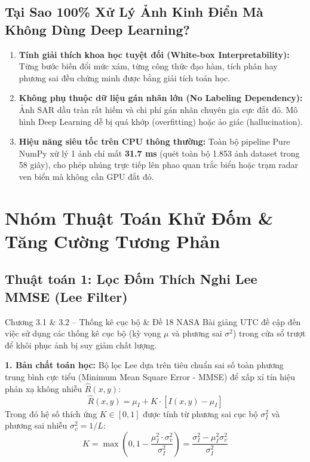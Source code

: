 \documentclass[11pt,a4paper]{article}
\begin{document}
\subsection{Tại Sao 100\% Xử Lý Ảnh Kinh Điển Mà Không Dùng Deep Learning?}
\begin{whyuse}
\begin{enumerate}
    \item \textbf{Tính giải thích khoa học tuyệt đối (White-box Interpretability):} Từng bước biến đổi mức xám, từng công thức đạo hàm, tích phân hay phương sai đều chứng minh được bằng giải tích toán học.
    \item \textbf{Không phụ thuộc dữ liệu gán nhãn lớn (No Labeling Dependency):} Ảnh SAR dầu tràn rất hiếm và chi phí gán nhãn chuyên gia cực đắt đỏ. Mô hình Deep Learning dễ bị quá khớp (overfitting) hoặc ảo giác (hallucination).
    \item \textbf{Hiệu năng siêu tốc trên CPU thông thường:} Toàn bộ pipeline Pure NumPy xử lý 1 ảnh chỉ mất \textbf{31.7 ms} (quét toàn bộ 1.853 ảnh dataset trong 58 giây), cho phép nhúng trực tiếp lên phao quan trắc biển hoặc trạm radar ven biển mà không cần GPU đắt đỏ.
\end{enumerate}
\end{whyuse}

\newpage

\section{Nhóm Thuật Toán Khử Đốm \& Tăng Cường Tương Phản}

\subsection{Thuật toán 1: Lọc Đốm Thích Nghi Lee MMSE (Lee Filter)}
\begin{slidemapping}{Chương 3.1 \& 3.2 -- Thống kê cục bộ \& Đề 18 NASA}
Bài giảng UTC đề cập đến việc sử dụng các thống kê cục bộ (kỳ vọng $\mu$ và phương sai $\sigma^2$) trong cửa sổ trượt để khôi phục ảnh bị suy giảm chất lượng.
\end{slidemapping}

\textbf{1. Bản chất toán học:}
Bộ lọc Lee dựa trên tiêu chuẩn sai số toàn phương trung bình cực tiểu (Minimum Mean Square Error - MMSE) để xấp xỉ tín hiệu phản xạ không nhiễu $\hat{R}(x, y)$:
\begin{equation}
\hat{R}(x, y) = \mu_I + K \cdot \left[ I(x, y) - \mu_I \right]
\end{equation}
Trong đó hệ số thích ứng $K \in [0, 1]$ được tính từ phương sai cục bộ $\sigma_I^2$ và phương sai nhiễu $\sigma_v^2 = 1/L$:
\begin{equation}
K = \max\left( 0, 1 - \frac{\mu_I^2 \cdot \sigma_v^2}{\sigma_I^2} \right) = \frac{\sigma_I^2 - \mu_I^2 \sigma_v^2}{\sigma_I^2}
\end{equation}
\end{document}
